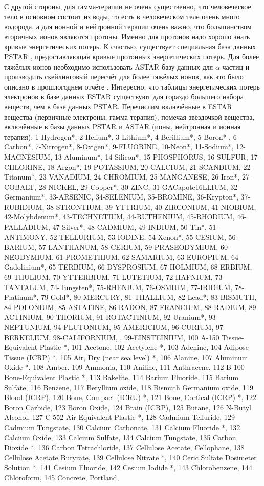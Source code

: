 \documentclass[a4paper,12pt]{article}
\begin{document}
\begin{large}
    С другой стороны, для гамма-терапии не очень существенно, что человеческое тело в основном состоит из воды, то есть в человеческом теле очень много водорода, а для ионной и нейтронной терапии очень важно, что большинством вторичных ионов являются протоны.
    Именно для протонов надо хорошо знать кривые энергетических потерь.
    К счастью, существует специальная база данных PSTAR \cite{PSTAR}, предоставляющая кривые протонных энергетических потерь.
    Для более тяжёлых ионов необходимо использовать ASTAR \cite{ASTAR} базу данных для $\alpha$-частиц и производить скейлинговый пересчёт для более тяжёлых ионов, как это было описано в прошлогоднем отчёте \cite{70/662-T}.
    Интересно, что таблицы энергетических потерь электронов в базе данных ESTAR \cite{ESTAR} существуют для гораздо большего набора веществ, чем в базе данных PSTAR.
    Перечислим включённые в ESTAR вещества (первичные электроны, гамма-терапия), помечая звёздочкой вещества, включённые в базы данных PSTAR и ASTAR (ионы, нейтронная и ионная терапия): 1-Hydrogen*, 2-Helium*, 3-Lithium*, 4-Berillium*, 5-Boron*  , 6-Carbon*, 7-Nitrogen*, 8-Oxigen*, 9-FLUORINE, 10-Neon*, 11-Sodium*, 12-MAGNESIUM, 13-Aluminum*, 14-Silicon*, 15-PHOSPHORUS, 16-SULFUR, 17-CHLORINE, 18-Argon*, 19-POTASSIUM, 20-CALCIUM, 21-SCANDIUM, 22-Titanum*, 23-VANADIUM, 24-CHROMIUM, 25-MANGANESE, 26-Iron*, 27-COBALT, 28-NICKEL, 29-Copper*, 30-ZINC, 31-GACapote16LLIUM, 32-Germanium*, 33-ARSENIC, 34-SELENIUM, 35-BROMINE, 36-Krypton*, 37-RUBIDIUM, 38-STRONTIUM, 39-YTTRIUM, 40-ZIRCONIUM, 41-NIOBIUM, 42-Molybdenum*, 43-TECHNETIUM, 44-RUTHENIUM, 45-RHODIUM, 46-PALLADIUM, 47-Silver*, 48-CADMIUM, 49-INDIUM, 50-Tin*, 51-ANTIMONY, 52-TELLURIUM, 53-IODINE, 54-Xenon*, 55-CESIUM, 56-BARIUM, 57-LANTHANUM, 58-CERIUM, 59-PRASEODYMIUM, 60-NEODYMIUM, 61-PROMETHIUM, 62-SAMARIUM, 63-EUROPIUM, 64-Gadolinium*, 65-TERBIUM, 66-DYSPROSIUM, 67-HOLMIUM, 68-ERBIUM, 69-THULIUM, 70-YTTERBIUM, 71-LUTETIUM, 72-HAFNIUM, 73-TANTALUM, 74-Tungsten*, 75-RHENIUM, 76-OSMIUM, 77-IRIDIUM, 78-Platinum*, 79-Gold*, 80-MERCURY, 81-THALLIUM, 82-Lead*, 83-BISMUTH, 84-POLONIUM, 85-ASTATINE, 86-RADON, 87-FRANCIUM, 88-RADIUM, 89-ACTINIUM, 90-THORIUM, 91-ROTACTINIUM, 92-Uranium*, 93-NEPTUNIUM, 94-PLUTONIUM, 95-AMERICIUM, 96-CURIUM, 97-BERKELIUM, 98-CALIFORNIUM, , 99-EINSTEINIUM, 100 A-150 Tissue-Equivalent Plastic *, 101 Acetone, 102 Acetylene *, 103 Adenine, 104 Adipose Tissue (ICRP) *, 105 Air, Dry (near sea level) *, 106 Alanine, 107 Aluminum Oxide *, 108 Amber, 109 Ammonia, 110 Aniline, 111 Anthracene, 112 B-100 Bone-Equivalent Plastic *, 113 Bakelite, 114 Barium Fluoride, 115 Barium Sulfate, 116 Benzene, 117 Beryllium oxide, 118 Bismuth Germanium oxide, 119 Blood (ICRP), 120 Bone, Compact (ICRU) *, 121 Bone, Cortical (ICRP) *, 122 Boron Carbide, 123 Boron Oxide, 124 Brain (ICRP), 125 Butane, 126 N-Butyl Alcohol, 127 C-552 Air-Equivalent Plastic *, 128 Cadmium Telluride, 129 Cadmium Tungstate, 130 Calcium Carbonate, 131 Calcium Fluoride *, 132 Calcium Oxide, 133 Calcium Sulfate, 134 Calcium Tungstate, 135 Carbon Dioxide *, 136 Carbon Tetrachloride, 137 Cellulose Acetate, Cellophane, 138 Cellulose Acetate Butyrate, 139 Cellulose Nitrate *, 140 Ceric Sulfate Dosimeter Solution *, 141 Cesium Fluoride, 142 Cesium Iodide *, 143 Chlorobenzene, 144 Chloroform, 145 Concrete, Portland, 
\end{large}
\end{document}
